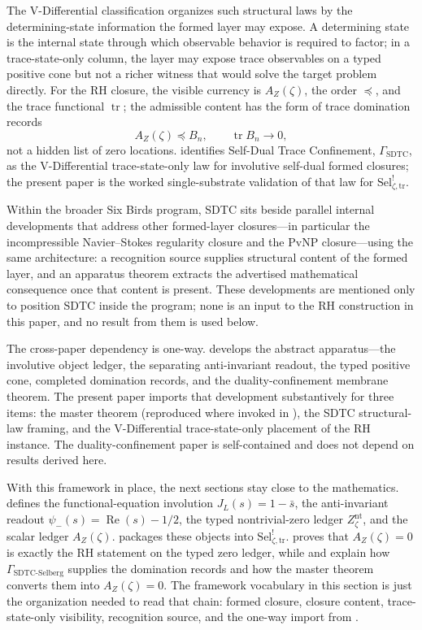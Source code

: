 \documentclass[11pt]{article}
\DeclareMathOperator{\trace}{tr}
\DeclareMathOperator{\Real}{Re}
\newcommand{\JL}{J_{L}}
\newcommand{\psimRH}{\psi_{-}}
\newcommand{\Znt}{Z_{\zeta}^{\mathrm{nt}}}
\newcommand{\AZ}{A_{Z}(\zeta)}
\newcommand{\Sel}{\mathrm{Sel}^{!}_{\zeta,\mathrm{tr}}}
\newcommand{\GamSDTCSelberg}{\Gamma_{\mathrm{SDTC\text{-}Selberg}}}
\newcommand{\GamSDTC}{\Gamma_{\mathrm{SDTC}}}
\theoremstyle{definition}
\begin{document}
The V-Differential classification organizes such structural laws by
the determining-state information the formed layer may expose.  A
determining state is the internal state through which observable
behavior is required to factor; in a trace-state-only column, the
layer may expose trace observables on a typed positive cone but not
a richer witness that would solve the target problem directly.  For
the RH closure, the visible currency is \(\AZ\), the order
\(\preceq\), and the trace functional \(\trace\); the admissible
content has the form of trace domination records
\[
  \AZ \preceq B_n,
  \qquad
  \trace B_n \to 0,
\]
not a hidden list of zero locations.  \citet{TsiokosSDTC2026}
identifies Self-Dual Trace Confinement, \(\GamSDTC\), as the
V-Differential trace-state-only law for involutive self-dual formed
closures; the present paper is the worked single-substrate
validation of that law for \(\Sel\).

Within the broader Six Birds program, SDTC sits beside parallel
internal developments that address other formed-layer closures---in
particular the incompressible Navier--Stokes regularity closure and
the PvNP closure---using the same architecture: a recognition source
supplies structural content of the formed layer, and an apparatus
theorem extracts the advertised mathematical consequence once that
content is present.  These developments are mentioned only to
position SDTC inside the program; none is an input to the RH
construction in this paper, and no result from them is used below.

The cross-paper dependency is one-way.  \citet{TsiokosSDTC2026}
develops the abstract apparatus---the involutive object ledger, the
separating anti-invariant readout, the typed positive cone,
completed domination records, and the duality-confinement membrane
theorem.  The present paper imports that development substantively
for three items: the master theorem (reproduced where invoked in
), the SDTC structural-law framing, and the
V-Differential trace-state-only placement of the RH instance.  The
duality-confinement paper is self-contained and does not depend on
results derived here.

With this framework in place, the next sections stay close to the
mathematics.   defines the
functional-equation involution \(\JL(s)=1-\bar{s}\), the
anti-invariant readout \(\psimRH(s)=\Real(s)-1/2\), the typed
nontrivial-zero ledger \(\Znt\), and the scalar ledger \(\AZ\).
 packages these objects into \(\Sel\).
 proves that \(\AZ=0\) is exactly the
RH statement on the typed zero ledger, while
 and  explain
how \(\GamSDTCSelberg\) supplies the domination records and how the
master theorem converts them into \(\AZ=0\).  The framework
vocabulary in this section is just the organization needed to read
that chain: formed closure, closure content, trace-state-only
visibility, recognition source, and the one-way import from
\citet{TsiokosSDTC2026}.
 
\end{document}
